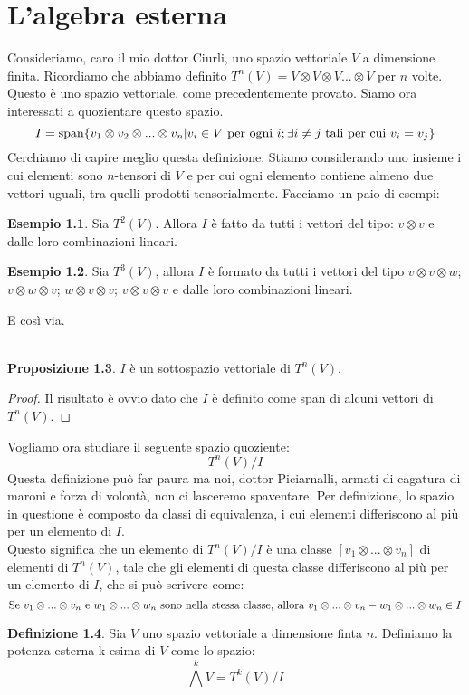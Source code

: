 \documentclass[12pt,a4paper]{report}
\theoremstyle{definition}
\newtheorem{Def}{Definizione}[chapter]
\theoremstyle{Theorem}
\newtheorem{Prop}[Def]{Proposizione}
\theoremstyle{definition}
\newtheorem{Ex}[Def]{Esempio}
\theoremstyle{definition}
\theoremstyle{definition}
\begin{document}
	\chapter{L'algebra esterna}
Consideriamo, caro il mio dottor Ciurli, uno spazio vettoriale $V$ a dimensione finita. Ricordiamo che abbiamo definito $T^n(V)=V\otimes V\otimes V... \otimes V$ per $n$ volte. Questo è uno spazio vettoriale, come precedentemente provato. Siamo ora interessati a quozientare questo spazio. 
$$I=\hbox{span}\{v_1\otimes v_2 \otimes...\otimes v_n|v_i\in V \hbox{ per ogni } i; \exists i\neq j \hbox{ tali per cui } v_i=v_j\}$$
Cerchiamo di capire meglio questa definizione. Stiamo considerando uno insieme i cui elementi sono $n$-tensori di $V$ e per cui ogni elemento contiene almeno due vettori uguali, tra quelli prodotti tensorialmente. Facciamo un paio di esempi:
\begin{Ex}
	Sia $T^2(V)$. Allora $I$ è fatto da tutti i vettori del tipo: $v\otimes v$ e dalle loro combinazioni lineari.
\end{Ex}
\begin{Ex}
	Sia $T^3(V)$, allora $I$ è formato da tutti i vettori del tipo $v\otimes v\otimes w$; $v\otimes w\otimes v$; $w\otimes v\otimes v$; $v\otimes v\otimes v$ e dalle loro combinazioni lineari.
\end{Ex}
E così via.\\
\\
\begin{Prop}
	$I$ è un sottospazio vettoriale di $T^n(V)$.
\end{Prop}
\begin{proof}
	Il risultato è ovvio dato che $I$ è definito come span di alcuni vettori di $T^n(V)$.
\end{proof}
Vogliamo ora studiare il seguente spazio quoziente: 
$$T^n(V)/I$$
Questa definizione può far paura ma noi, dottor Piciarnalli, armati di cagatura di maroni e forza di volontà, non ci lasceremo spaventare. Per definizione, lo spazio in questione è composto da classi di equivalenza, i cui elementi differiscono al più per un elemento di $I$.\\
Questo significa che un elemento di $T^n(V)/I$ è una classe $[v_1\otimes...\otimes v_n]$ di elementi di $T^n(V)$, tale che gli elementi di questa classe differiscono al più per un elemento di $I$, che si può scrivere come:
$$\hbox{Se } v_1\otimes...\otimes v_n \hbox{ e } w_1\otimes...\otimes w_n \hbox{ sono nella stessa classe, allora } v_1\otimes...\otimes v_n- w_1\otimes...\otimes w_n\in I$$
\begin{Def}
	Sia $V$ uno spazio vettoriale a dimensione finta $n$. Definiamo la potenza esterna k-esima di $V$ come lo spazio:
	$$\bigwedge^k V=T^k(V)/I$$
\end{Def}
\end{document}
